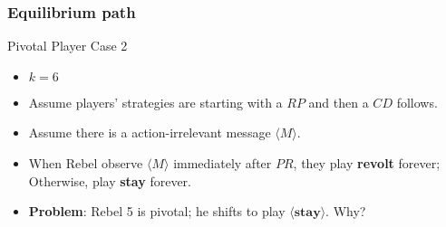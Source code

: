 \documentclass[10pt]{beamer}
\begin{document}
\begin{frame}
\frametitle{Equilibrium path}

Pivotal Player Case 2

\begin{itemize}
\item $k=6$
\item Assume players' strategies are starting with a $RP$ and then a $CD$ follows. 
\item Assume there is a action-irrelevant message $\langle M \rangle$.
\item When Rebel observe $\langle M \rangle$ immediately after $PR$, they play \textbf{revolt} forever; Otherwise, play \textbf{stay} forever.

\end{itemize}

\begin{center}
\end{center}

\begin{itemize}
\item \textbf{Problem}: Rebel 5 is pivotal; he shifts to play $\langle \textbf{stay} \rangle$. Why?
\end{itemize}

\end{frame}
\end{document}
